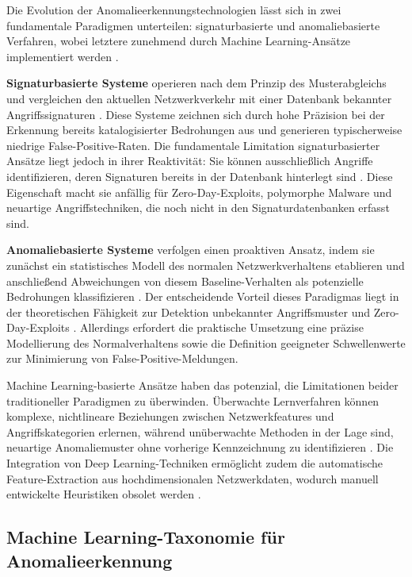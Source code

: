 \documentclass[11pt,a4paper]{article}
\begin{document}
    Die Evolution der Anomalieerkennungstechnologien lässt sich in zwei fundamentale Paradigmen unterteilen: signaturbasierte und anomaliebasierte Verfahren, wobei letztere zunehmend durch  Machine Learning-Ansätze implementiert werden \parencite{Ring2019, Belavagi2016}.

    \textbf{Signaturbasierte Systeme} operieren nach dem Prinzip des Musterabgleichs und vergleichen den aktuellen Netzwerkverkehr mit einer Datenbank bekannter Angriffssignaturen \parencite{Ring2019}. Diese Systeme zeichnen sich durch hohe Präzision bei der Erkennung bereits katalogisierter Bedrohungen aus und generieren typischerweise niedrige False-Positive-Raten. Die fundamentale Limitation signaturbasierter Ansätze liegt jedoch in ihrer Reaktivität: Sie können ausschließlich Angriffe identifizieren, deren Signaturen bereits in der Datenbank hinterlegt sind \parencite{Vinayakumar2019}. Diese Eigenschaft macht sie anfällig für Zero-Day-Exploits, polymorphe Malware und neuartige Angriffstechniken, die noch nicht in den Signaturdatenbanken erfasst sind.

    \textbf{Anomaliebasierte Systeme} verfolgen einen proaktiven Ansatz, indem sie zunächst ein statistisches Modell des normalen Netzwerkverhaltens etablieren und anschließend Abweichungen von diesem Baseline-Verhalten als potenzielle Bedrohungen klassifizieren \parencite{Ring2019}. Der entscheidende Vorteil dieses Paradigmas liegt in der theoretischen Fähigkeit zur Detektion unbekannter Angriffsmuster und Zero-Day-Exploits \parencite{Vinayakumar2019}. Allerdings erfordert die praktische Umsetzung eine präzise Modellierung des Normalverhaltens sowie die Definition geeigneter Schwellenwerte zur Minimierung von False-Positive-Meldungen.

    Machine Learning-basierte Ansätze haben das potenzial, die Limitationen beider traditioneller Paradigmen zu überwinden. Überwachte Lernverfahren können komplexe, nichtlineare Beziehungen zwischen Netzwerkfeatures und Angriffskategorien erlernen, während unüberwachte Methoden in der Lage sind, neuartige Anomaliemuster ohne vorherige Kennzeichnung zu identifizieren \parencite{Vinayakumar2019}. Die Integration von Deep Learning-Techniken ermöglicht zudem die automatische Feature-Extraction aus hochdimensionalen Netzwerkdaten, wodurch manuell entwickelte Heuristiken obsolet werden \parencite{Goodfellow2016}.

    \subsection{Machine Learning-Taxonomie für Anomalieerkennung}
\end{document}
